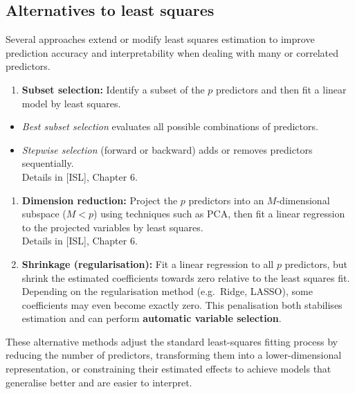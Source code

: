 \documentclass[
  letterpaper,
  DIV=11,
  numbers=noendperiod]{scrartcl}
\providecommand{\tightlist}{%
  \setlength{\itemsep}{0pt}\setlength{\parskip}{0pt}}\usepackage{longtable,booktabs,array}
\begin{document}
\subsection{Alternatives to least
squares}\label{alternatives-to-least-squares}

Several approaches extend or modify least squares estimation to improve
prediction accuracy and interpretability when dealing with many or
correlated predictors.

\begin{enumerate}
\def\labelenumi{(\arabic{enumi})}
\tightlist
\item
  \textbf{Subset selection:} Identify a subset of the \(p\) predictors
  and then fit a linear model by least squares.
\end{enumerate}

\begin{itemize}
\tightlist
\item
  \emph{Best subset selection} evaluates all possible combinations of
  predictors.
\item
  \emph{Stepwise selection} (forward or backward) adds or removes
  predictors sequentially.\\
  Details in {[}ISL{]}, Chapter 6.
\end{itemize}

\begin{enumerate}
\def\labelenumi{(\arabic{enumi})}
\setcounter{enumi}{1}
\item
  \textbf{Dimension reduction:} Project the \(p\) predictors into an
  \(M\)-dimensional subspace (\(M < p\)) using techniques such as PCA,
  then fit a linear regression to the projected variables by least
  squares.\\
  Details in {[}ISL{]}, Chapter 6.
\item
  \textbf{Shrinkage (regularisation):} Fit a linear regression to all
  \(p\) predictors, but shrink the estimated coefficients towards zero
  relative to the least squares fit. Depending on the regularisation
  method (e.g.~Ridge, LASSO), some coefficients may even become exactly
  zero. This penalisation both stabilises estimation and can perform
  \textbf{automatic variable selection}.
\end{enumerate}

These alternative methods adjust the standard least-squares fitting
process by reducing the number of predictors, transforming them into a
lower-dimensional representation, or constraining their estimated
effects to achieve models that generalise better and are easier to
interpret.
\end{document}
